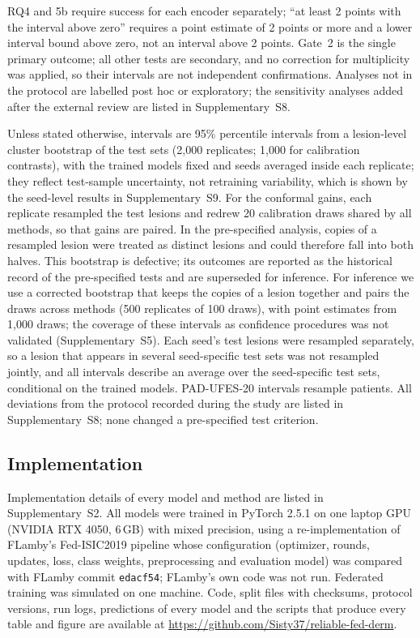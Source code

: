 RQ4 and 5b require success for each encoder separately; ``at least 2 points with the interval above
zero'' requires a point estimate of 2 points or more and a lower interval bound above zero, not an
interval above 2 points. Gate~2 is the single primary outcome; all other tests are secondary, and no
correction for multiplicity was applied, so their intervals are not independent confirmations.
Analyses not in the protocol are labelled post hoc or exploratory; the sensitivity analyses added after
the external review are listed in Supplementary~S8.

Unless stated otherwise, intervals are 95\% percentile intervals from a lesion-level cluster bootstrap
\cite{field2007cluster} of the test sets (2,000 replicates; 1,000 for calibration
contrasts), with the trained models fixed and seeds averaged inside each replicate; they reflect
test-sample uncertainty, not retraining variability, which is shown by the seed-level results in
Supplementary~S9. For the conformal gains, each replicate resampled the test lesions and redrew 20
calibration draws shared by all methods, so that gains are paired. In the pre-specified analysis, copies of
a resampled lesion were treated as distinct lesions and could therefore fall into both halves. This bootstrap is defective; its outcomes are reported as the historical record of the pre-specified tests and are superseded for inference. For inference we use a corrected bootstrap that keeps the copies of a lesion together and pairs the draws across methods (500 replicates of 100 draws), with point estimates from 1,000 draws; the coverage of these intervals as confidence procedures was not validated (Supplementary~S5). Each seed's test lesions were resampled separately, so a lesion that appears in several seed-specific test sets was not resampled jointly, and all intervals describe an average over the seed-specific test sets, conditional on the trained models. PAD-UFES-20 intervals resample patients. All deviations from the protocol recorded during the study are
listed in Supplementary~S8; none changed a pre-specified test criterion.

\subsection{Implementation}
\label{sec:impl}

Implementation details of every model and method are listed in Supplementary~S2. All models were
trained in PyTorch 2.5.1 \cite{paszke2019pytorch} on one laptop GPU (NVIDIA RTX 4050,
6\,GB) with mixed precision, using a re-implementation of FLamby's Fed-ISIC2019 pipeline whose
configuration (optimizer, rounds, updates, loss, class weights, preprocessing and evaluation model) was
compared with FLamby commit \texttt{edacf54}; FLamby's own code was not run. Federated training was
simulated on one machine. Code, split files with checksums, protocol versions, run logs, predictions of
every model and the scripts that produce every table and figure are available at
\url{https://github.com/Sisty37/reliable-fed-derm}.
